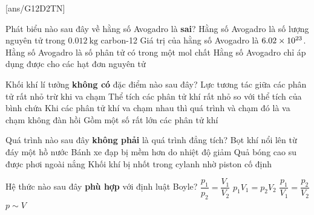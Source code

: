 [ans/G12D2TN]
\begin{ex}
	Phát biểu nào sau đây về hằng số Avogadro là \textbf{sai}?	
	\choice
	{Hằng số Avogadro là số lượng nguyên tử trong $\SI{0.012}{\kilogram}$ carbon-12}
	{Giá trị của hằng số Avogadro là $\SI{6.02E23}{}$.}
	{Hằng số Avogadro là số phân tử có trong một mol chất}
	{\True Hằng số Avogadro chỉ áp dụng được cho các hạt đơn nguyên tử}
	\loigiai{}
\end{ex}
\begin{ex}
	Khối khí lí tưởng \textbf{không có} đặc điểm nào sau đây?
	\choice
	{Lực tương tác giữa các phân tử rất nhỏ trừ khi va chạm}
	{Thể tích các phân tử khí rất nhỏ so với thể tích của bình chứa}
	{\True Khi các phân tử khí va chạm nhau thì quá trình và chạm đó là va chạm không đàn hồi}
	{Gồm một số rất lớn các phân tử khí}
	\loigiai{}
\end{ex}
\begin{ex}
	Quá trình nào sau đây \textbf{không phải} là quá trình đẳng tích?
	\choice
	{\True Bọt khí nổi lên từ đáy một hồ nước}
	{Bánh xe đạp bị mềm hơn do nhiệt độ giảm}
	{Quả bóng cao su được phơi ngoài nắng}
	{Khối khí bị nhốt trong cylanh nhờ piston cố định}
	\loigiai{}
\end{ex}
\begin{ex}
	Hệ thức nào sau đây \textbf{phù hợp} với định luật Boyle?
	\choice
	{$\dfrac{p_1}{p_2}=\dfrac{V_1}{V_2}$}
	{\True $p_1V_1=p_2V_2$}
	{$\dfrac{p_1}{V_1}=\dfrac{p_2}{V_2}$}
	{$p\sim V$}
	\loigiai{}
\end{ex}
\begin{ex}
	\loigiai{}
\end{ex}
